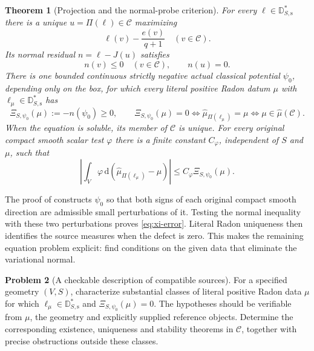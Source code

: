 \documentclass[11pt,a4paper]{article}
\newcommand{\MathEqref}[1]{{\hypersetup{linkcolor=EquationLink}\eqref{#1}}}
\newtheorem{theorem}{Theorem}[section]
\theoremstyle{definition}
\newtheorem{problem}[theorem]{Problem}
\theoremstyle{remark}
\numberwithin{equation}{section}
\newcommand{\dd}{\mathrm d}
\newcommand{\C}{\mathscr C}
\begin{document}
\begin{theorem}[Projection and the normal-probe criterion]
\label{thm:normal-probe}
For every $\ell\in\mathbb D_{S,\mathrm s}^*$ there is a unique
$u=\Pi(\ell)\in\C$ maximizing
\[
                        \ell(v)-\frac{e(v)}{q+1}
                                    \quad(v\in\C).
\]
Its normal residual $n=\ell-J(u)$ satisfies
\begin{equation}
                    n(v)\le0\quad(v\in\C),\qquad n(u)=0.
                         \label{eq:normal-cone}
\end{equation}
There is one bounded continuous strictly negative actual classical potential
$\psi_0$, depending only on the box, for which every literal positive
Radon datum $\mu$ with $\ell_\mu\in\mathbb D_{S,\mathrm s}^*$ has
\begin{equation}
 \Xi_{S,\psi_0}(\mu):=-n(\psi_0)\ge0,
 \qquad
 \Xi_{S,\psi_0}(\mu)=0
     \Longleftrightarrow\widehat\mu_{\Pi(\ell_\mu)}=\mu
     \Longleftrightarrow\mu\in\widehat\mu(\C).
                         \label{eq:xi}
\end{equation}
When the equation is soluble, its member of $\C$ is unique.  For every
original compact smooth scalar test $\varphi$ there is a finite
constant $C_\varphi$, independent of $S$ and $\mu$, such that
\begin{equation}
 \left|\int_V\varphi\,
       \dd(\widehat\mu_{\Pi(\ell_\mu)}-\mu)\right|
                     \le C_\varphi\Xi_{S,\psi_0}(\mu).
                         \label{eq:xi-error}
\end{equation}
\end{theorem}

The proof of \cite{R12} constructs $\psi_0$ so that both signs of
each original compact smooth direction are admissible small
perturbations of it.  Testing the normal inequality with these two
perturbations proves \MathEqref{eq:xi-error}.  Literal Radon
uniqueness then identifies the source measures when the defect is
zero.  This makes the remaining equation problem explicit: find
conditions on the given data that eliminate the variational normal.

\begin{problem}[A checkable description of compatible sources]
\label{problem:sources}
For a specified geometry $(V,S)$, characterize substantial classes of
literal positive Radon data $\mu$ for which
$\ell_\mu\in\mathbb D_{S,\mathrm s}^*$ and
$\Xi_{S,\psi_0}(\mu)=0$.  The hypotheses should be verifiable from
$\mu$, the geometry and explicitly supplied reference objects.
Determine the corresponding existence, uniqueness and stability
theorems in $\C$, together with precise obstructions outside these
classes.
\end{problem}
\end{document}

